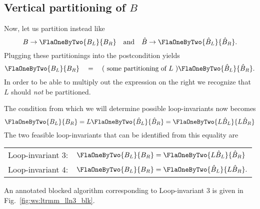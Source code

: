 \subsection{Vertical partitioning of $ B$}

Now, let us partition instead like
\[
B \rightarrow \FlaOneByTwo{ B_{L}}{ B_{R} }
\quad
\mbox{and}
\quad
\hat{B} \rightarrow \FlaOneByTwo{ \hat{B}_{L}}{ \hat{B}_{R} }.
\]
Plugging these partitionings into the postcondition yields
\[
\FlaOneByTwo{ B_{L}}{ B_{R} }
\quad
=
\quad
( \mbox{ some partitioning of $ L $ } )
\FlaOneByTwo{ \hat{B}_{L}}{ \hat{B}_{R} }.
\]
In order to be able to multiply out the expression on the right we
recognize that $ L $ should {\em not} be partitioned.

The condition from which we will determine possible loop-invariants
now becomes
\[
\FlaOneByTwo{ B_{L}}{ B_{R} }
=
L
\FlaOneByTwo{ \hat{B}_{L}}{ \hat{B}_{R} }
=
\FlaOneByTwo{ L \hat{B}_{L}}{ L \hat{B}_{R} }
\]
The two feasible loop-invariants that can be identified from this
equality are
\begin{center}
\begin{tabular}{p{1.5in}  l}
Loop-invariant 3: & 
$
\FlaOneByTwo{ B_{L}}{ B_{R} }
=
\FlaOneByTwo{ L \hat{B}_{L}}{ \hat{B}_{R} }
$ \\ 
Loop-invariant 4: & 
$
\FlaOneByTwo{ B_{L}}{ B_{R} }
=
\FlaOneByTwo{ \hat{B}_{L}}{ L \hat{B}_{R} }.
$
\end{tabular}
\end{center}
An annotated blocked algorithm corresponding to Loop-invariant 3 is
given in Fig.~\ref{fig:ws:ltrmm_lln3_blk}.

\renewcommand{\precondition}{B = \hat{B} \wedge \LowTr( L ) \wedge \ColDim( L )=\RowDim( B )}

\renewcommand{\postcondition}{B = L \hat{B}}

\renewcommand{\invariant}{
\FlaOneByTwo{ B_L}{B_R} =
\FlaOneByTwo{ L \hat{B}_L }{ \hat{B}_R }
\wedge
\ldots
}

\renewcommand{\guard}{ \neg \SameSize( B, B_L ) }

\renewcommand{\partitionings}{
$ 
B \rightarrow \FlaOneByTwo{ B_{L} }{ B_{R} }
$ and
$ 
\hat{B} \rightarrow \FlaOneByTwo{ \hat{B}_{L} }
                          { \hat{B}_{R} }
$
}
\renewcommand{\partitionsizes}{
$ B_{L} $ and $ \hat{ B }_L $ have $ 0 $ columns
}

\renewcommand{\blocksize}{b}

\renewcommand{\repartitionings}{
$ 
\FlaOneByTwo{ B_L }{ B_R } 
\rightarrow
\FlaOneByThreeR{ B_0 }{ B_1 }{ B_2 }
$
and
$ 
\FlaOneByTwo{ \hat{B}_L }{ \hat{B}_R } 
\rightarrow
\FlaOneByThreeR{ \hat{B}_0 }{ \hat{B}_1 }{ \hat{B}_2 }
$
}
\renewcommand{\repartitionsizes}{
$ B_1 $ and $ \hat{B}_1 $ have $ b $ columns
}

